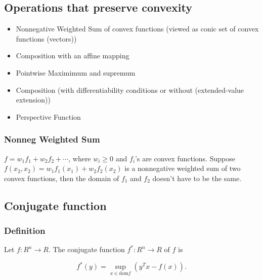 \subsection{Operations that preserve convexity}
\begin{itemize}
\item Nonnegative Weighted Sum of convex functions (viewed as conic set of convex functions (vectors))
\item Composition with an affine mapping
\item Pointwise Maximimum and supremum
\item Composition (with differentiability conditions or without (extended-value extension))
\item Perspective Function
\end{itemize}
\subsubsection{Nonneg Weighted Sum} %
$f = w_1f_1 + w_2 f_2 + \cdots$, where $w_i \ge 0$ and $f_i$'s are convex functions.
Suppose $f(x_2,x_2) = w_1f_1(x_1) + w_2f_2(x_2)$ is a nonnegative weighted sum of two convex functions, then the domain of $f_1$ and $f_2$ doesn't have to be the same.



\subsection{Conjugate function}
\subsubsection{\bf Definition} 
Let $f: R^n \longrightarrow R$. The conjugate function $f^*: R^n \longrightarrow R$ of $f$ is

\begin{equation}
   f^*(y)= \sup_{x \in \text{dom}f}\left( y^T x - f(x) \right).
\end{equation}

